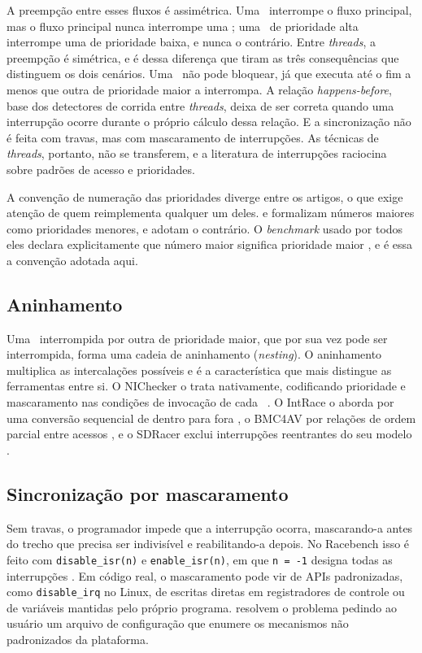A preempção entre esses fluxos é assimétrica. Uma \isr\ interrompe o fluxo
principal, mas o fluxo principal nunca interrompe uma \isr; uma \isr\ de
prioridade alta interrompe uma de prioridade baixa, e nunca o contrário. Entre
\textit{threads}, a preempção é simétrica, e é dessa diferença que
 tiram as três consequências que distinguem os dois cenários.
Uma \isr\ não pode bloquear, já que executa até o fim a menos que outra de
prioridade maior a interrompa. A relação \textit{happens-before}, base dos
detectores de corrida entre \textit{threads}, deixa de ser correta quando uma
interrupção ocorre durante o próprio cálculo dessa relação. E a sincronização
não é feita com travas, mas com mascaramento de interrupções. As técnicas de
\textit{threads}, portanto, não se transferem, e a literatura de interrupções
raciocina sobre padrões de acesso e prioridades.

A convenção de numeração das prioridades diverge entre os artigos, o que exige
atenção de quem reimplementa qualquer um deles.
 e  formalizam números maiores como
prioridades menores, e  adotam o contrário. O
\textit{benchmark} usado por todos eles declara explicitamente que número maior
significa prioridade maior \cite{racebench}, e é essa a convenção adotada aqui.

\subsection{Aninhamento}

Uma \isr\ interrompida por outra de prioridade maior, que por sua vez pode ser
interrompida, forma uma cadeia de aninhamento (\textit{nesting}). O aninhamento
multiplica as intercalações possíveis e é a característica que mais distingue
as ferramentas entre si. O NIChecker o trata nativamente, codificando
prioridade e mascaramento nas condições de invocação de cada \isr\
\cite{nichecker}. O IntRace o aborda por uma conversão sequencial de dentro
para fora \cite{intrace}, o BMC4AV por relações de ordem parcial entre acessos
\cite{bmc4av}, e o SDRacer exclui interrupções reentrantes do seu
modelo \cite{sdracer}.

\subsection{Sincronização por mascaramento}

Sem travas, o programador impede que a interrupção ocorra, mascarando-a antes
do trecho que precisa ser indivisível e reabilitando-a depois.
No Racebench isso é feito com \texttt{disable\_isr(n)} e
\texttt{enable\_isr(n)}, em que \texttt{n = -1} designa todas as interrupções
\cite{racebench}. Em código real, o mascaramento pode vir de APIs padronizadas,
como \texttt{disable\_irq} no Linux, de escritas diretas em registradores de
controle ou de variáveis mantidas pelo próprio programa. \citeonline{intrace}
resolvem o problema pedindo ao usuário um arquivo de configuração que enumere
os mecanismos não padronizados da plataforma.

